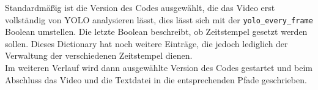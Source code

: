 {	Standardmäßig ist die Version des Codes ausgewählt, die das Video erst vollständig von YOLO analysieren lässt, dies lässt sich mit der \lstinline|yolo_every_frame| Boolean umstellen. Die letzte Boolean beschreibt, ob Zeitstempel gesetzt werden sollen. Dieses Dictionary hat noch weitere Einträge, die jedoch lediglich der Verwaltung der verschiedenen Zeitstempel dienen. \\
	

	Im weiteren Verlauf wird dann ausgewählte Version des Codes gestartet und beim Abschluss das Video und die Textdatei in die entsprechenden Pfade geschrieben.
}



